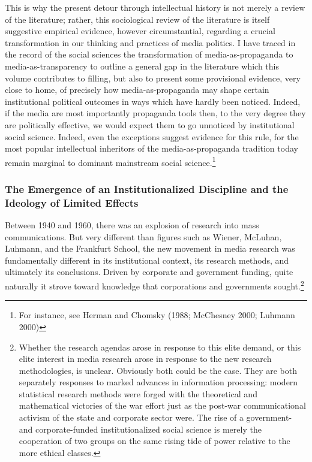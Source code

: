 \documentclass[12pt,book]{article}
\begin{document}
This is why the present detour through intellectual history is not
merely a review of the literature; rather, this sociological review of
the literature is itself suggestive empirical evidence, however
circumstantial, regarding a crucial transformation in our thinking and
practices of media politics. I have traced in the record of the social
sciences the transformation of media-as-propaganda to
media-as-transparency to outline a general gap in the literature which
this volume contributes to filling, but also to present some provisional
evidence, very close to home, of precisely how media-as-propaganda may
shape certain institutional political outcomes in ways which have hardly
been noticed. Indeed, if the media are most importantly propaganda tools
then, to the very degree they are politically effective, we would expect
them to go unnoticed by institutional social science. Indeed, even the
exceptions suggest evidence for this rule, for the most popular
intellectual inheritors of the media-as-propaganda tradition today
remain marginal to dominant mainstream social science.\footnote{For
  instance, see Herman and Chomsky (1988; McChesney 2000; Luhmann 2000)}

\subsubsection{The Emergence of an Institutionalized Discipline and the
Ideology of Limited
Effects}\label{the-emergence-of-an-institutionalized-discipline-and-the-ideology-of-limited-effects}

Between 1940 and 1960, there was an explosion of research into mass
communications. But very different than figures such as Wiener, McLuhan,
Luhmann, and the Frankfurt School, the new movement in media research
was fundamentally different in its institutional context, its research
methods, and ultimately its conclusions. Driven by corporate and
government funding, quite naturally it strove toward knowledge that
corporations and governments sought.\footnote{Whether the research
  agendas arose in response to this elite demand, or this elite interest
  in media research arose in response to the new research methodologies,
  is unclear. Obviously both could be the case. They are both separately
  responses to marked advances in information processing: modern
  statistical research methods were forged with the theoretical and
  mathematical victories of the war effort just as the post-war
  communicational activism of the state and corporate sector were. The
  rise of a government- and corporate-funded institutionalized social
  science is merely the cooperation of two groups on the same rising
  tide of power relative to the more ethical classes.}
\end{document}
